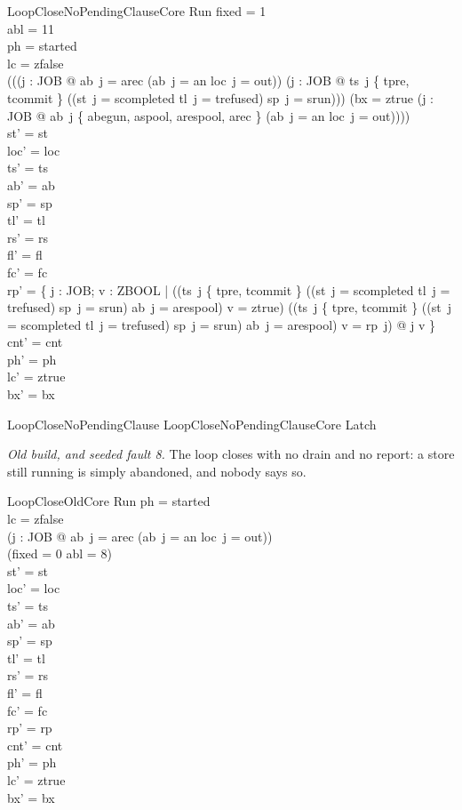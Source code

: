 \documentclass[a4paper,10pt,fleqn]{article}
\begin{document}
\begin{schema}{LoopCloseNoPendingClauseCore}
\Delta Run
\where
fixed = 1 \\
abl = 11 \\
ph = started \\
lc = zfalse \\
(((\forall j : JOB @ ab~j = arec \lor (ab~j = an \land loc~j = out)) \land (\forall j : JOB @ ts~j \notin \{ tpre, tcommit \} \land \lnot ((st~j = scompleted \lor tl~j = trefused) \land sp~j = srun))) \lor (bx = ztrue \land (\forall j : JOB @ ab~j \in \{ abegun, aspool, arespool, arec \} \lor (ab~j = an \land loc~j = out)))) \\
st' = st \\
loc' = loc \\
ts' = ts \\
ab' = ab \\
sp' = sp \\
tl' = tl \\
rs' = rs \\
fl' = fl \\
fc' = fc \\
rp' = \{ j : JOB; v : ZBOOL | ((ts~j \in \{ tpre, tcommit \} \lor ((st~j = scompleted \lor tl~j = trefused) \land sp~j = srun) \lor ab~j = arespool) \land v = ztrue) \lor (\lnot (ts~j \in \{ tpre, tcommit \} \lor ((st~j = scompleted \lor tl~j = trefused) \land sp~j = srun) \lor ab~j = arespool) \land v = rp~j) @ j \mapsto v \} \\
cnt' = cnt \\
ph' = ph \\
lc' = ztrue \\
bx' = bx
\end{schema}

\begin{zed}
LoopCloseNoPendingClause  LoopCloseNoPendingClauseCore \land Latch
\end{zed}

\emph{Old build, and seeded fault 8.} The loop closes with no drain and no report:
a store still running is simply abandoned, and nobody says so.

\begin{schema}{LoopCloseOldCore}
\Delta Run
\where
ph = started \\
lc = zfalse \\
(\forall j : JOB @ ab~j = arec \lor (ab~j = an \land loc~j = out)) \\
(fixed = 0 \lor abl = 8) \\
st' = st \\
loc' = loc \\
ts' = ts \\
ab' = ab \\
sp' = sp \\
tl' = tl \\
rs' = rs \\
fl' = fl \\
fc' = fc \\
rp' = rp \\
cnt' = cnt \\
ph' = ph \\
lc' = ztrue \\
bx' = bx
\end{schema}
\end{document}
